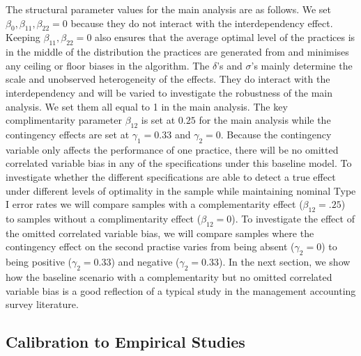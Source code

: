 \documentclass[12pt]{article}
\begin{document}
The structural parameter values for the main analysis are as follows. We set $\beta_0, \beta_{11}, \beta_{22} = 0$ because they do not interact with the interdependency effect. Keeping $\beta_{11}, \beta_{22} = 0$ also ensures that the average optimal level of the practices is in the middle of the distribution the practices are generated from and minimises any ceiling or floor biases in the algorithm.  The $\delta$'s and $\sigma$'s mainly determine the scale and unobserved heterogeneity of the effects. They do interact with the interdependency and will be varied to investigate the robustness of the main analysis. We set them all equal to 1 in the main analysis. The key complimentarity parameter $\beta_{12}$ is set at $0.25$ for the main analysis while the contingency effects are set at $\gamma_1 = 0.33$ and $\gamma_2 = 0$. Because the contingency variable only affects the performance of one practice, there will be no omitted correlated variable bias in any of the specifications under this baseline model. To investigate whether the different specifications are able to detect a true effect under different levels of optimality in the sample while maintaining nominal Type I error rates we will compare samples with a complementarity effect ($\beta_{12} = .25$) to samples without a complimentarity effect ($\beta_{12} = 0$). To investigate the effect of the omitted correlated variable bias, we will compare samples where the contingency effect on the second practise varies from being absent ($\gamma_2 = 0$) to being positive ($\gamma_2 = 0.33$) and negative ($\gamma_2 = 0.33$).  In the next section, we show how the baseline scenario with a complementarity but no omitted correlated variable bias is a good reflection of a typical study in the management accounting survey literature.

\subsection{Calibration to Empirical Studies}\label{optimality}
\end{document}
